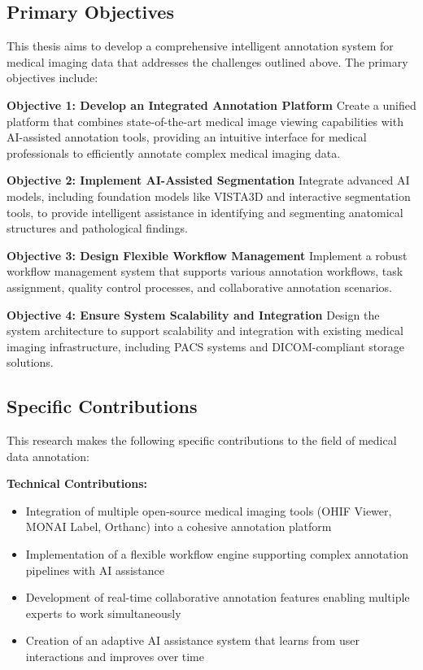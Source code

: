 \subsection{Primary Objectives}

This thesis aims to develop a comprehensive intelligent annotation system for medical imaging data that addresses the challenges outlined above. The primary objectives include:

\textbf{Objective 1: Develop an Integrated Annotation Platform}
Create a unified platform that combines state-of-the-art medical image viewing capabilities with AI-assisted annotation tools, providing an intuitive interface for medical professionals to efficiently annotate complex medical imaging data.

\textbf{Objective 2: Implement AI-Assisted Segmentation}
Integrate advanced AI models, including foundation models like VISTA3D and interactive segmentation tools, to provide intelligent assistance in identifying and segmenting anatomical structures and pathological findings.

\textbf{Objective 3: Design Flexible Workflow Management}
Implement a robust workflow management system that supports various annotation workflows, task assignment, quality control processes, and collaborative annotation scenarios.

\textbf{Objective 4: Ensure System Scalability and Integration}
Design the system architecture to support scalability and integration with existing medical imaging infrastructure, including PACS systems and DICOM-compliant storage solutions.

\subsection{Specific Contributions}

This research makes the following specific contributions to the field of medical data annotation:

\textbf{Technical Contributions:}
\begin{itemize}
    \item Integration of multiple open-source medical imaging tools (OHIF Viewer, MONAI Label, Orthanc) into a cohesive annotation platform
    \item Implementation of a flexible workflow engine supporting complex annotation pipelines with AI assistance
    \item Development of real-time collaborative annotation features enabling multiple experts to work simultaneously
    \item Creation of an adaptive AI assistance system that learns from user interactions and improves over time
\end{itemize}

